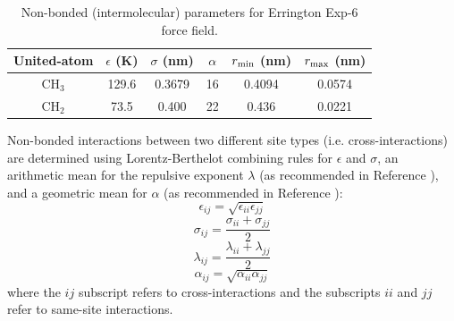 \documentclass[preprint,letterpaper,floatfix,citeautoscript,aip,jcp]{revtex4-1}
\begin{document}
\begin{table}[h!]
	\caption{Non-bonded (intermolecular) parameters for Errington Exp-6 force field.} \label{tab:nonbonded Exp6}
	\begin{center}
		\begin{tabular}{|c|c|c|c|c|c|}
			\hline
			United-atom & $\epsilon$ (K) & $\sigma$ (nm) & $\alpha$ & $r_{\rm min}$ (nm) & $r_{\rm max}$ (nm)  \\ \hline
			CH$_3$ & 129.6  & 0.3679 & 16 & 0.4094 & 0.0574 \\ 
			CH$_2$ & 73.5 & 0.400 & 22 & 0.436 & 0.0221 \\ \hline
		\end{tabular}
	\end{center} 
\end{table}

Non-bonded interactions between two different site types (i.e. cross-interactions) are determined using Lorentz-Berthelot combining rules \cite{Allen1987} for $\epsilon$ and $\sigma$, an arithmetic mean for the repulsive exponent $\lambda$ (as recommended in Reference ), and a geometric mean for $\alpha$ (as recommended in Reference ):
\begin{equation} \label{eq:Lorentz-Berthelot_eps}
\epsilon_{ij} = \sqrt{\epsilon_{ii} \epsilon_{jj}}
\end{equation}
\begin{equation} \label{eq:Lorentz-Berthelot_sig}
\sigma_{ij} = \frac{\sigma_{ii} + \sigma_{jj}}{2}
\end{equation}
\begin{equation} \label{eq:Lorentz-Berthelot_lam}
\lambda_{ij} = \frac{\lambda_{ii} + \lambda_{jj}}{2}
\end{equation}
\begin{equation} \label{eq:Lorentz-Berthelot_alpha}
\alpha_{ij} = \sqrt{\alpha_{ii} \alpha_{jj}}
\end{equation}
where the $ij$ subscript refers to cross-interactions and the subscripts $ii$ and $jj$ refer to same-site interactions. 
\end{document}
